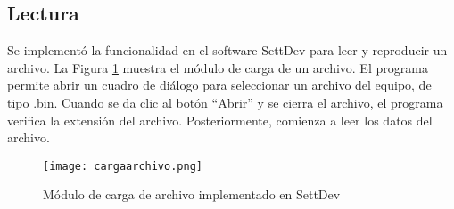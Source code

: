 \subsection{Lectura}

Se implementó la funcionalidad en el software SettDev para leer y reproducir un archivo. La Figura \ref{fig:cargaarchivo} muestra el módulo de carga de un archivo. El programa permite abrir un cuadro de diálogo para seleccionar un archivo del equipo, de tipo .bin. Cuando se da clic al botón ``Abrir'' y se cierra el archivo, el programa verifica la extensión del archivo. Posteriormente, comienza a leer los datos del archivo.

\begin{figure}[htb]
	\centering
	\texttt{[image: cargaarchivo.png]}
	\caption{Módulo de carga de archivo implementado en SettDev}
	\label{fig:cargaarchivo}
\end{figure}